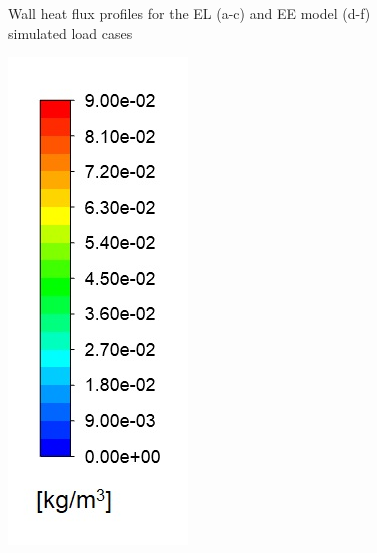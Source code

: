 \documentclass{webofc}
\begin{document}
\begin{figure}[h!]
\setlength{\belowcaptionskip}{0pt} 
\caption{Wall heat flux profiles for the EL (a-c) and EE model (d-f) simulated load cases}
\label{fig_wall_heat}
\end{figure}

\begin{figure}[h!]
\centering
\includegraphics[scale = 0.25]{concentration}

\end{figure}
\end{document}
